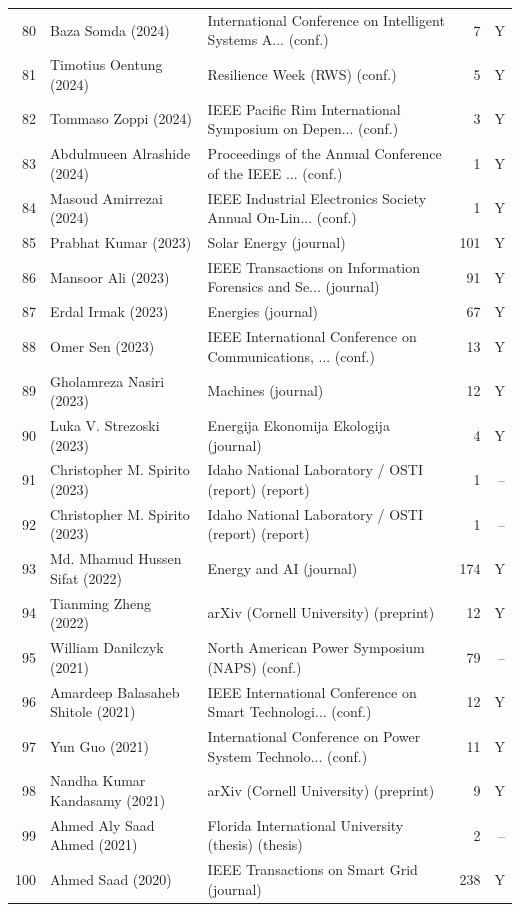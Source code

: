 \begin{longtable}{@{}r p{5.9cm} p{4.4cm} r r@{}}
80 & Baza Somda (2024) & International Conference on Intelligent Systems A... (conf.) & 7 & Y \\
81 & Timotius Oentung (2024) & Resilience Week (RWS) (conf.) & 5 & Y \\
82 & Tommaso Zoppi (2024) & IEEE Pacific Rim International Symposium on Depen... (conf.) & 3 & Y \\
83 & Abdulmueen Alrashide (2024) & Proceedings of the Annual Conference of the IEEE ... (conf.) & 1 & Y \\
84 & Masoud Amirrezai (2024) & IEEE Industrial Electronics Society Annual On-Lin... (conf.) & 1 & Y \\
85 & Prabhat Kumar (2023) & Solar Energy (journal) & 101 & Y \\
86 & Mansoor Ali (2023) & IEEE Transactions on Information Forensics and Se... (journal) & 91 & Y \\
87 & Erdal Irmak (2023) & Energies (journal) & 67 & Y \\
88 & Omer Sen (2023) & IEEE International Conference on Communications, ... (conf.) & 13 & Y \\
89 & Gholamreza Nasiri (2023) & Machines (journal) & 12 & Y \\
90 & Luka V. Strezoski (2023) & Energija Ekonomija Ekologija (journal) & 4 & Y \\
91 & Christopher M. Spirito (2023) & Idaho National Laboratory / OSTI (report) (report) & 1 & -- \\
92 & Christopher M. Spirito (2023) & Idaho National Laboratory / OSTI (report) (report) & 1 & -- \\
93 & Md. Mhamud Hussen Sifat (2022) & Energy and AI (journal) & 174 & Y \\
94 & Tianming Zheng (2022) & arXiv (Cornell University) (preprint) & 12 & Y \\
95 & William Danilczyk (2021) & North American Power Symposium (NAPS) (conf.) & 79 & -- \\
96 & Amardeep Balasaheb Shitole (2021) & IEEE International Conference on Smart Technologi... (conf.) & 12 & Y \\
97 & Yun Guo (2021) & International Conference on Power System Technolo... (conf.) & 11 & Y \\
98 & Nandha Kumar Kandasamy (2021) & arXiv (Cornell University) (preprint) & 9 & Y \\
99 & Ahmed Aly Saad Ahmed (2021) & Florida International University (thesis) (thesis) & 2 & -- \\
100 & Ahmed Saad (2020) & IEEE Transactions on Smart Grid (journal) & 238 & Y \\
\end{longtable}
